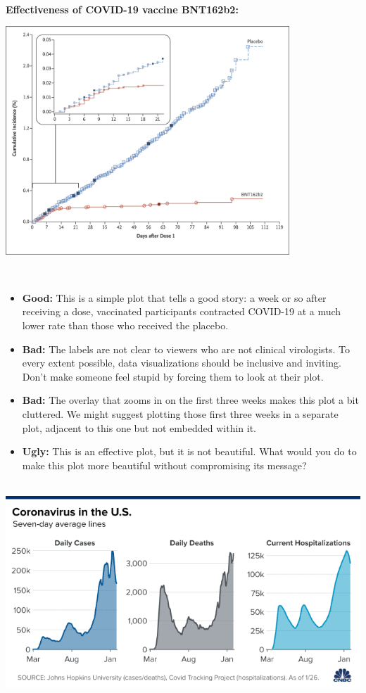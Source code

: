 \documentclass[
]{book}
\begin{document}
~\\
\textbf{Effectiveness of COVID-19 vaccine BNT162b2:}

\includegraphics[width=0.8\textwidth,height=\textheight]{img/visd.png}

~

\begin{itemize}
\item
  \textbf{Good:} This is a simple plot that tells a good story: a week or so after receiving a dose, vaccinated participants contracted COVID-19 at a much lower rate than those who received the placebo.
\item
  \textbf{Bad:} The labels are not clear to viewers who are not clinical virologists. To every extent possible, data visualizations should be inclusive and inviting. Don't make someone feel stupid by forcing them to look at their plot.
\item
  \textbf{Bad:} The overlay that zooms in on the first three weeks makes this plot a bit cluttered. We might suggest plotting those first three weeks in a separate plot, adjacent to this one but not embedded within it.
\item
  \textbf{Ugly:} This is an effective plot, but it is not beautiful. What would you do to make this plot more beautiful without compromising its message?
\end{itemize}

~\\

\includegraphics{img/vise.png}
\end{document}
